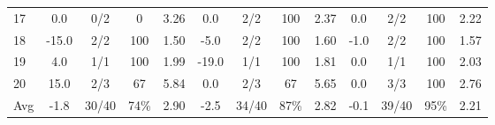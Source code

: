 \begin{table}[p]
{\begin{tabular}{l|cccc|cccc|cccc}
17 & 0.0 & 0/2 & 0 & 3.26 & 0.0 & 2/2 & 100 & 2.37 & 0.0 & 2/2 & 100 & 2.22 \\
18 & -15.0 & 2/2 & 100 & 1.50 & -5.0 & 2/2 & 100 & 1.60 & -1.0 & 2/2 & 100 & 1.57 \\
19 & 4.0 & 1/1 & 100 & 1.99 & -19.0 & 1/1 & 100 & 1.81 & 0.0 & 1/1 & 100 & 2.03 \\
20 & 15.0 & 2/3 & 67 & 5.84 & 0.0 & 2/3 & 67 & 5.65 & 0.0 & 3/3 & 100 & 2.76 \\
\midrule
Avg & -1.8 & 30/40 & 74\% & 2.90 & -2.5 & 34/40 & 87\% & 2.82 & -0.1 & 39/40 & 95\% & 2.21 \\
\bottomrule
\end{tabular}%
}
\end{table}
